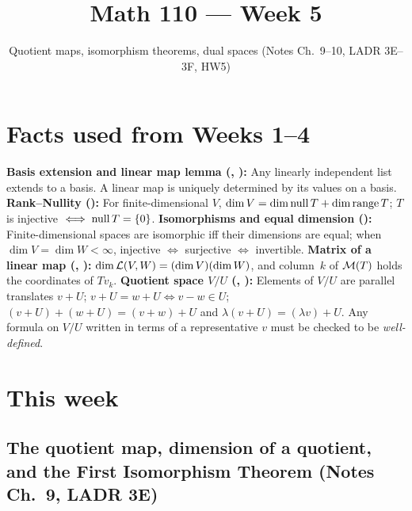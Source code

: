 \documentclass[10pt]{scrartcl}
\title{Math 110 --- Week 5}
\subtitle{Quotient maps, isomorphism theorems, dual spaces (Notes Ch.~9--10, LADR 3E--3F, HW5)}
\author{}\date{}\ihead{}
\begin{document}
\maketitle

\section{Facts used from Weeks 1--4}
\begin{enumerate}[label=(W\arabic*),leftmargin=2.8em,itemsep=4pt]
  \ii{} \textbf{Basis extension and linear map lemma (, ):} Any linearly independent list extends to a basis. A linear map is uniquely determined by its values on a basis.
  \ii{} \textbf{Rank--Nullity ():} For finite-dimensional $V$, $\dim V=\dim\operatorname{null} T+\dim\operatorname{range} T$; $T$ is injective $\iff\operatorname{null} T=\{0\}$.
  \ii{} \textbf{Isomorphisms and equal dimension ():} Finite-dimensional spaces are isomorphic iff their dimensions are equal; when $\dim V=\dim W<\infty$, injective $\iff$ surjective $\iff$ invertible.
  \ii{} \textbf{Matrix of a linear map (, ):} $\dim\mathcal L(V,W)=(\dim V)(\dim W)$, and column~$k$ of $\mathcal M(T)$ holds the coordinates of $Tv_k$.
  \ii{} \textbf{Quotient space $V/U$ (, ):} Elements of $V/U$ are parallel translates $v+U$; $v+U=w+U\iff v-w\in U$; $(v+U)+(w+U)=(v+w)+U$ and $\lambda(v+U)=(\lambda v)+U$. Any formula on $V/U$ written in terms of a representative $v$ must be checked to be \emph{well-defined}.
\end{enumerate}

\section{This week}

\subsection{The quotient map, dimension of a quotient, and the First Isomorphism Theorem (Notes Ch.~9, LADR 3E)}
\end{document}
